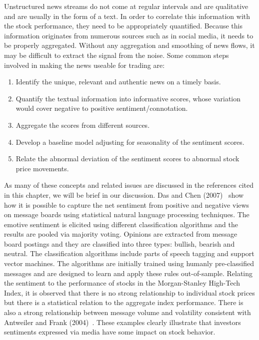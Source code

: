 Unstructured news streams do not come at regular intervals and are qualitative and are usually in the form of a text. In order to correlate this information with the stock performance, they need to be appropriately quantified. Because this information originates from numerous sources such as in social media, it needs to be properly aggregated. Without any aggregation and smoothing of news flows, it may be difficult to extract the signal from the noise. Some common steps involved in making the news useable for trading are:
	\begin{enumerate}[--]
	\item Identify the unique, relevant and authentic news on a timely basis.
	\item Quantify the textual information into informative scores, whose variation would cover negative to positive sentiment/connotation.
	\item Aggregate the scores from different sources.
	\item Develop a baseline model adjusting for seasonality of the sentiment scores.
	\item Relate the abnormal deviation of the sentiment scores to abnormal stock price movements. 
	\end{enumerate}


As many of these concepts and related issues are discussed in the references cited in this chapter, we will be brief in our discussion. Das and Chen (2007)~\cite{daschen} show how it is possible to capture the net sentiment from positive and negative views on message boards using statistical natural language processing techniques. The emotive sentiment is elicited using different classification algorithms and the results are pooled via majority voting. Opinions are extracted from message board postings and they are classified into three types: bullish, bearish and neutral. The classification algorithms include parts of speech tagging and support vector machines. The algorithms are initially trained using humanly pre-classified messages and are designed to learn and apply these rules out-of-sample. Relating the sentiment to the performance of stocks in the Morgan-Stanley High-Tech Index, it is observed that there is no strong relationship to individual stock prices but there is a statistical relation to the aggregate index performance. There is also a strong relationship between message volume and volatility consistent with Antweiler and Frank (2004)~\cite{antweiler2004all}. These examples clearly illustrate that investors sentiments expressed via media have some impact on stock behavior. 


